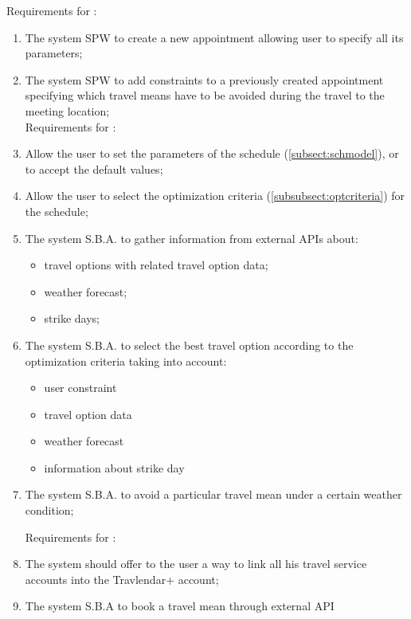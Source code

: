 Requirements for :
\begin{enumerate}
\renewcommand\labelenumi{\textbf{R\theenumi}}
\item The system SPW to create a new appointment allowing user to specify all its parameters; \label{req:R1}
\item The system SPW to add constraints to a previously created appointment specifying which travel means have to be avoided during the travel to the meeting location; \label{req:R2}
\\

Requirements for :

\item Allow the user to set the parameters of the schedule (\ref{subsect:schmodel}), or to accept the default values;
 
\item Allow the user to select the optimization criteria (\ref{subsubsect:optcriteria}) for the schedule;

\item The system S.B.A. to gather information from external APIs about: 
\begin{itemize}
\item travel options with related travel option data;
\item weather forecast;
\item strike days;
\end{itemize}

\item The system S.B.A. to select the best travel option according to the optimization criteria taking into account:
\begin{itemize}
\item user constraint
\item travel option data 
\item weather forecast
\item information about strike day
\end{itemize}


\item The system S.B.A. to avoid a particular travel mean under a certain weather condition;

Requirements for : 
\item The system should offer to the user a way to link all his travel service accounts into the Travlendar+ account;

\item The system S.B.A to book a travel mean through external API

\end{enumerate}

